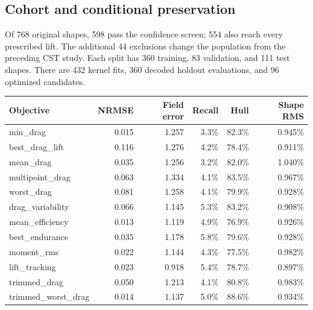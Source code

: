 \subsection{Cohort and conditional preservation}

Of 768 original shapes, 598 pass the confidence screen; 554 also reach every prescribed lift. The additional 44 exclusions change the population from the preceding CST study. Each split has 360 training, 83 validation, and 111 test shapes. There are 432 kernel fits, 360 decoded holdout evaluations, and 96 optimized candidates.

\begin{center}\small\begin{tabular}{lrrrrr}\toprule Objective & NRMSE & Field error & Recall & Hull & Shape RMS\\\midrule

min\_drag & 0.015 & 1.257 & 3.3\% & 82.3\% & 0.945\% \\

best\_drag\_lift & 0.116 & 1.276 & 4.2\% & 78.4\% & 0.911\% \\

mean\_drag & 0.035 & 1.256 & 3.2\% & 82.0\% & 1.040\% \\

multipoint\_drag & 0.063 & 1.334 & 4.1\% & 83.5\% & 0.967\% \\

worst\_drag & 0.081 & 1.258 & 4.1\% & 79.9\% & 0.928\% \\

drag\_variability & 0.066 & 1.145 & 5.3\% & 83.2\% & 0.908\% \\

mean\_efficiency & 0.013 & 1.119 & 4.9\% & 76.9\% & 0.926\% \\

best\_endurance & 0.035 & 1.178 & 5.8\% & 79.6\% & 0.928\% \\

moment\_rms & 0.022 & 1.144 & 4.3\% & 77.5\% & 0.982\% \\

lift\_tracking & 0.023 & 0.918 & 5.4\% & 78.7\% & 0.897\% \\

trimmed\_drag & 0.050 & 1.213 & 4.1\% & 80.8\% & 0.983\% \\

trimmed\_worst\_drag & 0.014 & 1.137 & 5.0\% & 88.6\% & 0.934\% \\

\bottomrule\end{tabular}\end{center}

